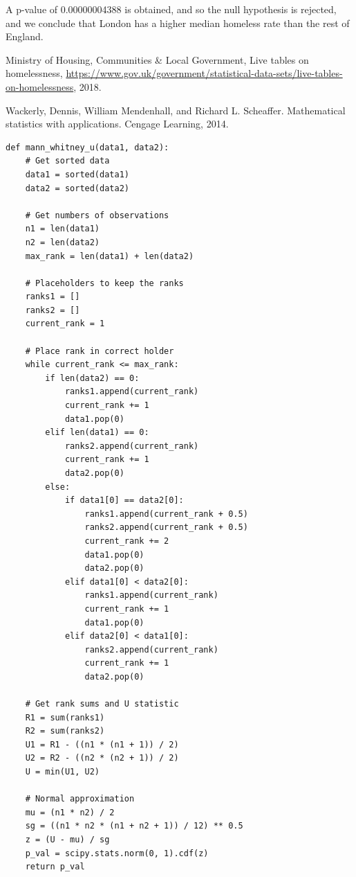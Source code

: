 \documentclass{article}
\begin{document}
A p-value of 0.00000004388 is obtained, and so the null hypothesis is rejected,
and we conclude that London has a higher median homeless rate than the rest of
England.

\begin{thebibliography}{9}

  Ministry of Housing, Communities \& Local Government,
  Live tables on homelessness,
  \url{https://www.gov.uk/government/statistical-data-sets/live-tables-on-homelessness},
  2018.

   Wackerly, Dennis, William Mendenhall, and Richard L. Scheaffer.
   Mathematical statistics with applications.
   Cengage Learning,
   2014.

\end{thebibliography}

\newpage

\small{
\begin{verbatim}
def mann_whitney_u(data1, data2):
    # Get sorted data
    data1 = sorted(data1)
    data2 = sorted(data2)
    
    # Get numbers of observations
    n1 = len(data1)
    n2 = len(data2)
    max_rank = len(data1) + len(data2)
    
    # Placeholders to keep the ranks
    ranks1 = []
    ranks2 = []
    current_rank = 1
    
    # Place rank in correct holder
    while current_rank <= max_rank:
        if len(data2) == 0:
            ranks1.append(current_rank)
            current_rank += 1
            data1.pop(0)
        elif len(data1) == 0:
            ranks2.append(current_rank)
            current_rank += 1
            data2.pop(0)
        else:
            if data1[0] == data2[0]:
                ranks1.append(current_rank + 0.5)
                ranks2.append(current_rank + 0.5)
                current_rank += 2
                data1.pop(0)
                data2.pop(0)
            elif data1[0] < data2[0]:
                ranks1.append(current_rank)
                current_rank += 1
                data1.pop(0)
            elif data2[0] < data1[0]:
                ranks2.append(current_rank)
                current_rank += 1
                data2.pop(0)
    
    # Get rank sums and U statistic
    R1 = sum(ranks1)
    R2 = sum(ranks2)
    U1 = R1 - ((n1 * (n1 + 1)) / 2)
    U2 = R2 - ((n2 * (n2 + 1)) / 2)
    U = min(U1, U2)
    
    # Normal approximation
    mu = (n1 * n2) / 2
    sg = ((n1 * n2 * (n1 + n2 + 1)) / 12) ** 0.5
    z = (U - mu) / sg
    p_val = scipy.stats.norm(0, 1).cdf(z)
    return p_val
\end{verbatim}
}
\end{document}
